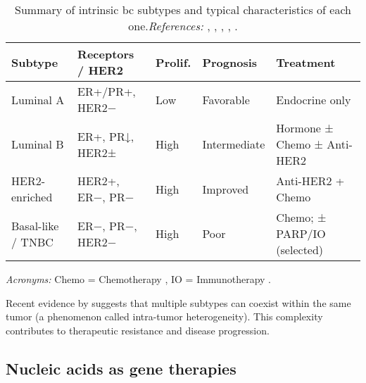 \renewcommand{\arraystretch}{1.3}
\begin{table}[h]
  \centering
  \small
  \caption{Summary of intrinsic \gls{bc} subtypes and typical characteristics of each one.\newline\textit{References:} \cite{clinical_implication_bca_Adamo2015}, \cite{diff_bca_usa_Howlader2018}, \cite{bc_subtypes_Prat2015Clinical}, \cite{updatedbca_Hong2022Breast}, \cite{tnbc_therapies_Mahalingam2020The}.}
  \label{tab:bc_subtypes_summary}
  \begin{tabularx}{\textwidth}{l l l l X}
    \toprule
    \textbf{Subtype}  & \textbf{Receptors / HER2} & \textbf{Prolif.} & \textbf{Prognosis} & \textbf{Treatment}          \\
    \midrule
    Luminal A         & ER+/PR+, HER2−            & Low              & Favorable          & Endocrine only              \\
    \midrule
    Luminal B         & ER+, PR↓, HER2±           & High             & Intermediate       & Hormone ± Chemo ± Anti-HER2 \\
    \midrule
    HER2-enriched     & HER2+, ER−, PR−           & High             & Improved           & Anti-HER2 + Chemo           \\
    \midrule
    Basal-like / TNBC & ER−, PR−, HER2−           & High             & Poor               & Chemo; ± PARP/IO (selected) \\

    \bottomrule
  \end{tabularx}

  \vspace{1ex}
  \raggedright
  \footnotesize
  \textit{Acronyms:} Chemo = Chemotherapy , IO = Immunotherapy .
\end{table}

Recent evidence by
\textcite{intratumor_heterogeneity_Yeo2017,origins_and_evolution_bca_Polyak2007}
suggests that multiple subtypes can coexist within the same tumor (a phenomenon
called intra-tumor heterogeneity). This complexity contributes to therapeutic
resistance and disease progression.

\subsection{Nucleic acids as gene therapies}
\label{sec:nucleic_acids_gene_therapies}

